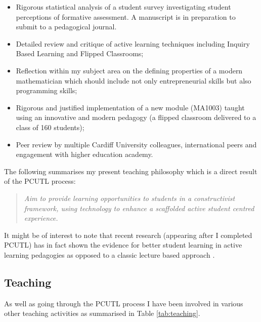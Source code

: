 \documentclass{article}
\begin{document}
\begin{itemize}
    \item Rigorous statistical analysis of a student survey investigating student perceptions of formative assessment. A manuscript is in preparation to submit to a pedagogical journal.
    \item Detailed review and critique of active learning techniques including Inquiry Based Learning and Flipped Classrooms;
    \item Reflection within my subject area on the defining properties of a modern mathematician which should include not only entrepreneurial skills but also programming skills;
    \item Rigorous and justified implementation of a new module (MA1003) taught using an innovative and modern pedagogy (a flipped classroom delivered to a class of 160 students);
    \item Peer review by multiple Cardiff University colleagues, international peers and engagement with higher education academy.
\end{itemize}

The following summarises my present teaching philosophy which is a direct result of the PCUTL process:

\begin{quote}
   \textit{Aim to provide learning opportunities to students in a constructivist framework, using technology to enhance a scaffolded active student centred experience.}
\end{quote}

It might be of interest to note that recent research (appearing after I completed PCUTL) has in fact shown the evidence for better student learning in active learning pedagogies as opposed to a classic lecture based approach \cite{freeman_active_2014}.

\subsection{Teaching}

As well as going through the PCUTL process I have been involved in various other teaching activities as summarised in Table \ref{tab:teaching}.
\end{document}
